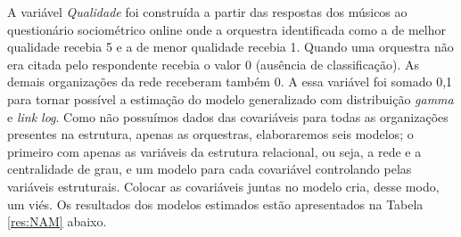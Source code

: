 \documentclass[a4paper, 12pt, openright, oneside, german, french, english, brazil]{abntex2}
\begin{document}
	A variável \textit{Qualidade} foi construída a partir das respostas dos músicos ao questionário sociométrico online onde a orquestra identificada como a de melhor qualidade recebia 5 e a de menor qualidade recebia 1. Quando uma orquestra não era citada pelo respondente recebia o valor 0 (ausência de classificação). As demais organizações da rede receberam também 0. A essa variável foi somado 0,1 para tornar possível a estimação do modelo generalizado com distribuição \textit{gamma} e \textit{link log}. Como não possuímos dados das covariáveis para todas as organizações presentes na estrutura, apenas as orquestras, elaboraremos seis modelos; o primeiro com apenas as variáveis da estrutura relacional, ou seja, a rede e a centralidade de grau, e um modelo para cada covariável controlando pelas variáveis estruturais. Colocar as covariáveis juntas no modelo cria, desse modo, um viés.
	Os resultados dos modelos estimados estão apresentados na Tabela \ref{res:NAM} abaixo.
	
\end{document}
